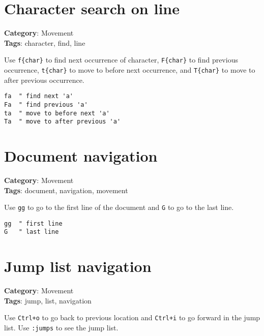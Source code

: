 {{{{{{{\section{Character search on line}

\textbf{Category}: Movement\\ \textbf{Tags}: character, find, line
\vspace{0.5cm}

Use {\footnotesize \Verb§f{char}§} to find next occurrence of character, {\footnotesize \Verb§F{char}§} to find previous occurrence, {\footnotesize \Verb§t{char}§} to move to before next occurrence, and {\footnotesize \Verb§T{char}§} to move to after previous occurrence.

\begin{Exa*}{}
\begin{Verbatim}[fontsize=\footnotesize, breaklines, breakanywhere]
fa  " find next 'a'
Fa  " find previous 'a'
ta  " move to before next 'a'
Ta  " move to after previous 'a'
\end{Verbatim}
\end{Exa*}

\section{Document navigation}

\textbf{Category}: Movement\\ \textbf{Tags}: document, navigation, movement
\vspace{0.5cm}

Use {\footnotesize \Verb§gg§} to go to the first line of the document and {\footnotesize \Verb§G§} to go to the last line.

\begin{Exa*}{}
\begin{Verbatim}[fontsize=\footnotesize, breaklines, breakanywhere]
gg  " first line
G   " last line
\end{Verbatim}
\end{Exa*}

\section{Jump list navigation}

\textbf{Category}: Movement\\ \textbf{Tags}: jump, list, navigation
\vspace{0.5cm}

Use {\footnotesize \Verb§Ctrl+o§} to go back to previous location and {\footnotesize \Verb§Ctrl+i§} to go forward in the jump list. Use {\footnotesize \Verb§:jumps§} to see the jump list.

}}}}}}}
